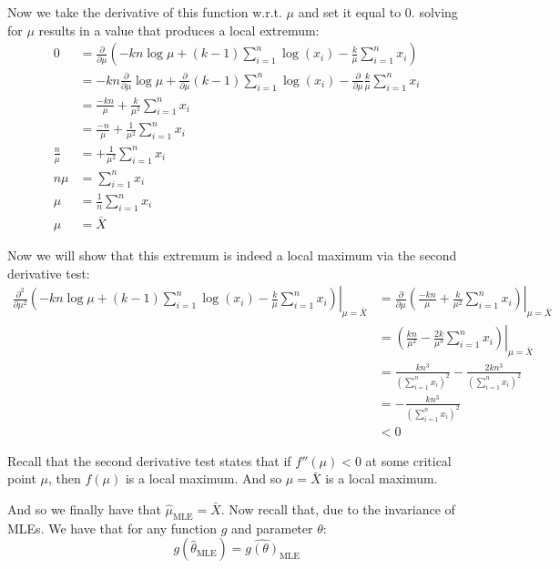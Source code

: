 \documentclass{article}
\begin{document}
Now we take the derivative of this function w.r.t. $\mu$ and set it equal to 0. solving for $\mu$ results in a value that produces a local extremum:
\begin{align*}
    0&=\frac{\partial}{\partial\mu}\left(-kn\log\mu+(k-1)\sum_{i=1}^n\log(x_i)-\frac{k}{\mu}\sum_{i=1}^nx_i\right)\tag{first order condition}\\
    &=-kn\frac{\partial}{\partial\mu}\log\mu+\frac{\partial}{\partial\mu}(k-1)\sum_{i=1}^n\log(x_i)-\frac{\partial}{\partial\mu}\frac{k}{\mu}\sum_{i=1}^nx_i\\
    &=\frac{-kn}{\mu}+\frac{k}{\mu^2}\sum_{i=1}^nx_i\\
    &=\frac{-n}{\mu}+\frac{1}{\mu^2}\sum_{i=1}^nx_i\\
    \frac{n}{\mu}&=+\frac{1}{\mu^2}\sum_{i=1}^nx_i\\
    n\mu&=\sum_{i=1}^nx_i\\
    \mu&=\frac{1}{n}\sum_{i=1}^nx_i\\
    \mu&=\bar X
\end{align*}

Now we will show that this extremum is indeed a local maximum via the second derivative test:
\begin{align*}
    \frac{\partial^2}{\partial\mu^2}\left.\left(-kn\log\mu+(k-1)\sum_{i=1}^n\log(x_i)-\frac{k}{\mu}\sum_{i=1}^nx_i\right)\right|_{\mu=\bar X}&=\left.\frac{\partial}{\partial\mu}\left(\frac{-kn}{\mu}+\frac{k}{\mu^2}\sum_{i=1}^nx_i\right)\right|_{\mu=\bar X}\\
    &=\left.\left(\frac{kn}{\mu^2}-\frac{2k}{\mu^3}\sum_{i=1}^nx_i\right)\right|_{\mu=\bar X}\\
    &=\frac{kn^3}{(\sum_{i=1}^nx_i)^2}-\frac{2kn^3}{(\sum_{i=1}^nx_i)^2}\\
    &=-\frac{kn^3}{(\sum_{i=1}^nx_i)^2}\\
    &<0\tag{$x_i>0$, $k>0$, $n>0$}
\end{align*}

Recall that the second derivative test states that if $f''(\mu)<0$ at some critical point $\mu$, then $f(\mu)$ is a local maximum. And so $\mu=\bar X$ is a local maximum. %

\bigskip

And so we finally have that $\hat\mu_{\text{MLE}}=\bar X$. Now recall that, due to the invariance of MLEs. We have that for any function $g$ and parameter $\theta$:
$$g(\hat\theta_{\text{MLE}})=\widehat{g(\theta)}_{\text{MLE}}$$
\end{document}
